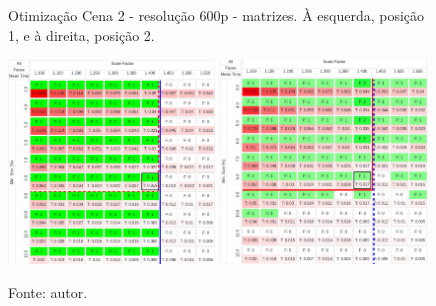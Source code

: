 \begin{figure}[H]
    \centering
    \caption[Otimização Cena 2 - resolução 600p - matrizes. À esquerda posição 1 e à direita, posição 2]{Otimização Cena 2 - resolução 600p - matrizes. À esquerda, posição 1, e à direita, posição 2.}
    \includegraphics[width=0.49\textwidth]{Cap4_Experimentos_Realizados/Figures/cena2_800x600_pos1_matriz.jpg}
    \includegraphics[width=0.49\textwidth]{Cap4_Experimentos_Realizados/Figures/cena2_800x600_pos2_matriz.jpg}
    \caption*{Fonte: autor.}
    \label{fig:otimizacaoCena2_600p_matrizes}
\end{figure}

